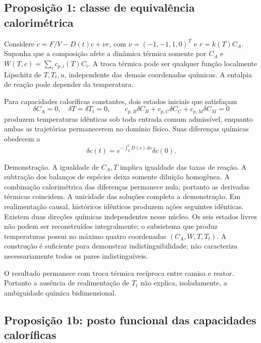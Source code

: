 \documentclass[
  11pt,
]{article}
\begin{document}
\hypertarget{proposiuxe7uxe3o-1-classe-de-equivaluxeancia-calorimuxe9trica}{%
\subsection{Proposição 1: classe de equivalência
calorimétrica}\label{proposiuxe7uxe3o-1-classe-de-equivaluxeancia-calorimuxe9trica}}

Considere \(\dot c=F/V-D(t)c+\nu r\), com \(\nu=(-1,-1,1,0)^T\) e
\(r=k(T)C_A\). Suponha que a composição afete a dinâmica térmica somente
por \(C_A\) e \(W(T,c)=\sum_i c_{p,i}(T)C_i\). A troca térmica pode ser
qualquer função localmente Lipschitz de \(T,T_t,u\), independente das
demais coordenadas químicas. A entalpia de reação pode depender da
temperatura.

Para capacidades caloríficas constantes, dois estados iniciais que
satisfaçam \[\delta C_A=0,\quad\delta T=\delta T_t=0,\qquad
c_{p,B}\delta C_B+c_{p,C}\delta C_C+c_{p,M}\delta C_M=0\] produzem
temperaturas idênticas sob toda entrada comum admissível, enquanto ambas
as trajetórias permanecerem no domínio físico. Suas diferenças químicas
obedecem a \[\delta c(t)=e^{-\int_0^tD(s)\,ds}\delta c(0).\]

Demonstração. A igualdade de \(C_A,T\) implica igualdade das taxas de
reação. A subtração dos balanços de espécies deixa somente diluição
homogênea. A combinação calorimétrica das diferenças permanece nula;
portanto as derivadas térmicas coincidem. A unicidade das soluções
completa a demonstração. Em realimentação causal, históricos idênticos
produzem ações seguintes idênticas. Existem duas direções químicas
independentes nesse núcleo. Os seis estados livres não podem ser
reconstruídos integralmente; o subsistema que produz temperaturas possui
no máximo quatro coordenadas \((C_A,W,T,T_t)\). A construção é
suficiente para demonstrar indistinguibilidade; não caracteriza
necessariamente todos os pares indistinguíveis.

O resultado permanece com troca térmica recíproca entre camisa e reator.
Portanto a ausência de realimentação de \(T_t\) não explica,
isoladamente, a ambiguidade química bidimensional.

\hypertarget{proposiuxe7uxe3o-1b-posto-funcional-das-capacidades-caloruxedficas}{%
\subsection{Proposição 1b: posto funcional das capacidades
caloríficas}\label{proposiuxe7uxe3o-1b-posto-funcional-das-capacidades-caloruxedficas}}
\end{document}
